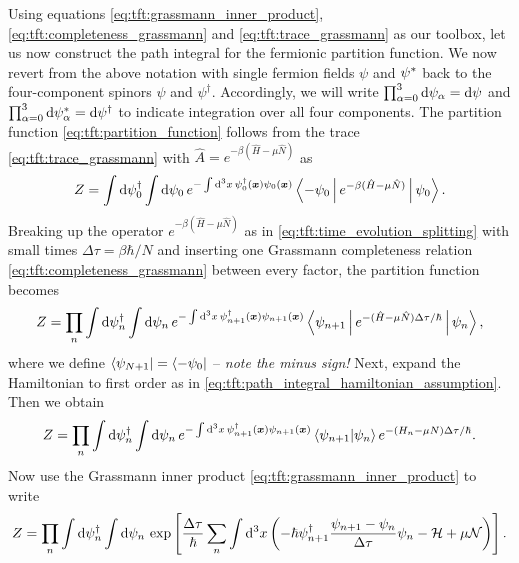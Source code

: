 Using equations \eqref{eq:tft:grassmann_inner_product}, \eqref{eq:tft:completeness_grassmann} and \eqref{eq:tft:trace_grassmann} as our toolbox, let us now construct the path integral for the fermionic partition function.
We now revert from the above notation with single fermion fields $\psi$ and ${\psi}^*$ back to the four-component spinors $\psi$ and $\psi^\dagger$.
Accordingly, we will write $\prod_{\alpha=0}^3 \mathop{}\!\mathrm{d} \psi_\alpha = \mathop{}\!\mathrm{d} \psi$ and $\prod_{\alpha=0}^3 \mathop{}\!\mathrm{d} {\psi}^*_\alpha = \mathop{}\!\mathrm{d} \psi^\dagger$ to indicate integration over all four components.
The partition function \eqref{eq:tft:partition_function} follows from the trace \eqref{eq:tft:trace_grassmann} with $\hat{A} = e^{-\beta (\hat{H} - \mu \hat{N})}$ as
\begin{equation}
	Z = \int \mathop{}\!\mathrm{d} \psi_0^\dagger \int \mathop{}\!\mathrm{d} \psi_0 \, e^{-\int \mathop{}\!\mathrm{d}^3 x \, \psi_{0}^\dagger({\bm{x}}) \psi_{0}({\bm{x}})} \Braket{-\psi_0 | e^{-\beta(\hat{H} - \mu \hat{N})} | \psi_0} .
\label{eq:tft:fermion_path_integral_after_completeness}
\end{equation}
Breaking up the operator $e^{-\beta (\hat{H} - \mu \hat{N})}$ as in \cref{eq:tft:time_evolution_splitting} with small times $\Delta \tau = \beta \hbar / N$ and inserting one Grassmann completeness relation \eqref{eq:tft:completeness_grassmann} between every factor, the partition function becomes
\begin{equation}
	Z = \prod_n \int \mathop{}\!\mathrm{d} \psi_n^\dagger \int \mathop{}\!\mathrm{d} \psi_n \, e^{-\int \mathop{}\!\mathrm{d}^3 x \, \psi_{n+1}^\dagger({\bm{x}}) \psi_{n+1}({\bm{x}})} \Braket{\psi_{n+1} | e^{-(\hat{H} - \mu \hat{N}) \Delta \tau / \hbar} | \psi_n} ,
\end{equation}
where we define $\bra{\psi_{N+1}} = \bra{-\psi_0}$ -- \emph{note the minus sign!}
Next, expand the Hamiltonian to first order as in \cref{eq:tft:path_integral_hamiltonian_assumption}.
Then we obtain
\begin{equation}
	Z = \prod_n \int \mathop{}\!\mathrm{d} \psi_n^\dagger \int \mathop{}\!\mathrm{d} \psi_n \, e^{-\int \mathop{}\!\mathrm{d}^3 x \, \psi_{n+1}^\dagger({\bm{x}}) \psi_{n+1}({\bm{x}})} \braket{\psi_{n+1} | \psi_n} e^{-(H_n - \mu N) \Delta \tau / \hbar} .
\end{equation}
Now use the Grassmann inner product \eqref{eq:tft:grassmann_inner_product} to write
\begin{equation}
	Z = \prod_n \int \mathop{}\!\mathrm{d} \psi_n^\dagger \int \mathop{}\!\mathrm{d} \psi_n \, \exp \left[ \frac{\Delta \tau}{\hbar} \sum_n \int \mathop{}\!\mathrm{d}^3 x \left( -\hbar \psi^\dagger_{n+1} \frac{\psi_{n+1} - \psi_n}{\Delta \tau} \psi_{n} - \mathcal{H} + \mu \mathcal{N} \right) \right] .
\end{equation}
